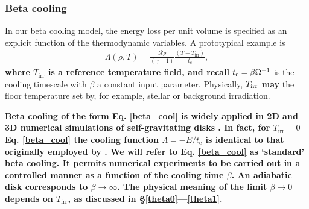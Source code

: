 \subsubsection{Beta cooling}\label{beta_cool_model}
In our beta cooling model, the energy loss per unit volume is specified  
as an explicit function of the thermodynamic variables. 
A prototypical example is 
\begin{align}\label{beta_cool}
  \Lambda(\rho, T) =
  \frac{\mathcal{R}\rho}{(\gamma-1)}\frac{\left(T-T_\mathrm{irr}\right)}{t_c},
\end{align}
{\bf where $T_\mathrm{irr}$ is a reference temperature field, and
recall}  $t_\mathrm{c} = \beta\Omega^{-1}$ is 
the cooling timescale with $\beta$ a constant input parameter. 
Physically, $T_\mathrm{irr}$ {\bf may} the floor temperature set by, 
for example, stellar or background irradiation. 

{\bf
Beta cooling of the form Eq. \ref{beta_cool} is widely applied in 2D
and 3D numerical simulations of self-gravitating disks \citep{gammie01,
  rice05,rice11,paardekooper12}. In fact, for $T_\mathrm{irr}=0$
Eq. \ref{beta_cool} the 
cooling function $\Lambda = -E/t_\mathrm{c}$ is identical
to that originally employed by \cite{gammie01}. 
We will refer to Eq. \ref{beta_cool} as  
`standard' beta cooling. It permits numerical experiments to be
carried out in a controlled manner as a function of the cooling time
$\beta$. An adiabatic disk corresponds to $\beta\to \infty$. The
physical meaning of the limit $\beta\to0$ depends on $T_\mathrm{irr}$, as
discussed in \S\ref{theta0}---\ref{theta1}.  
}

